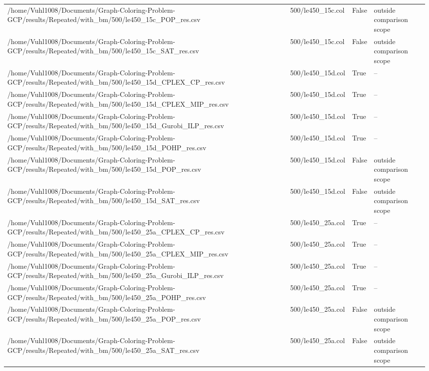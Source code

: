 \begin{table}[htbp]
\begin{tabular}{llll}
/home/Vuhl1008/Documents/Graph-Coloring-Problem-GCP/results/Repeated/with\_bm/500/le450\_15c\_POP\_res.csv & 500/le450\_15c.col & False & outside comparison scope \\
/home/Vuhl1008/Documents/Graph-Coloring-Problem-GCP/results/Repeated/with\_bm/500/le450\_15c\_SAT\_res.csv & 500/le450\_15c.col & False & outside comparison scope \\
/home/Vuhl1008/Documents/Graph-Coloring-Problem-GCP/results/Repeated/with\_bm/500/le450\_15d\_CPLEX\_CP\_res.csv & 500/le450\_15d.col & True & -- \\
/home/Vuhl1008/Documents/Graph-Coloring-Problem-GCP/results/Repeated/with\_bm/500/le450\_15d\_CPLEX\_MIP\_res.csv & 500/le450\_15d.col & True & -- \\
/home/Vuhl1008/Documents/Graph-Coloring-Problem-GCP/results/Repeated/with\_bm/500/le450\_15d\_Gurobi\_ILP\_res.csv & 500/le450\_15d.col & True & -- \\
/home/Vuhl1008/Documents/Graph-Coloring-Problem-GCP/results/Repeated/with\_bm/500/le450\_15d\_POHP\_res.csv & 500/le450\_15d.col & True & -- \\
/home/Vuhl1008/Documents/Graph-Coloring-Problem-GCP/results/Repeated/with\_bm/500/le450\_15d\_POP\_res.csv & 500/le450\_15d.col & False & outside comparison scope \\
/home/Vuhl1008/Documents/Graph-Coloring-Problem-GCP/results/Repeated/with\_bm/500/le450\_15d\_SAT\_res.csv & 500/le450\_15d.col & False & outside comparison scope \\
/home/Vuhl1008/Documents/Graph-Coloring-Problem-GCP/results/Repeated/with\_bm/500/le450\_25a\_CPLEX\_CP\_res.csv & 500/le450\_25a.col & True & -- \\
/home/Vuhl1008/Documents/Graph-Coloring-Problem-GCP/results/Repeated/with\_bm/500/le450\_25a\_CPLEX\_MIP\_res.csv & 500/le450\_25a.col & True & -- \\
/home/Vuhl1008/Documents/Graph-Coloring-Problem-GCP/results/Repeated/with\_bm/500/le450\_25a\_Gurobi\_ILP\_res.csv & 500/le450\_25a.col & True & -- \\
/home/Vuhl1008/Documents/Graph-Coloring-Problem-GCP/results/Repeated/with\_bm/500/le450\_25a\_POHP\_res.csv & 500/le450\_25a.col & True & -- \\
/home/Vuhl1008/Documents/Graph-Coloring-Problem-GCP/results/Repeated/with\_bm/500/le450\_25a\_POP\_res.csv & 500/le450\_25a.col & False & outside comparison scope \\
/home/Vuhl1008/Documents/Graph-Coloring-Problem-GCP/results/Repeated/with\_bm/500/le450\_25a\_SAT\_res.csv & 500/le450\_25a.col & False & outside comparison scope \\

\end{tabular}
\end{table}
